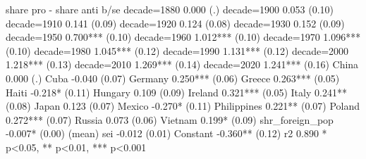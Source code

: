 	share pro - share anti
	b/se
decade=1880	0.000
	(.)
decade=1900	0.053
	(0.10)
decade=1910	0.141
	(0.09)
decade=1920	0.124
	(0.08)
decade=1930	0.152
	(0.09)
decade=1950	0.700***
	(0.10)
decade=1960	1.012***
	(0.10)
decade=1970	1.096***
	(0.10)
decade=1980	1.045***
	(0.12)
decade=1990	1.131***
	(0.12)
decade=2000	1.218***
	(0.13)
decade=2010	1.269***
	(0.14)
decade=2020	1.241***
	(0.16)
China	0.000
	(.)
Cuba	-0.040
	(0.07)
Germany	0.250***
	(0.06)
Greece	0.263***
	(0.05)
Haiti	-0.218*
	(0.11)
Hungary	0.109
	(0.09)
Ireland	0.321***
	(0.05)
Italy	0.241**
	(0.08)
Japan	0.123
	(0.07)
Mexico	-0.270*
	(0.11)
Philippines	0.221**
	(0.07)
Poland	0.272***
	(0.07)
Russia	0.073
	(0.06)
Vietnam	0.199*
	(0.09)
shr_foreign_pop	-0.007*
	(0.00)
(mean) sei	-0.012
	(0.01)
Constant	-0.360**
	(0.12)
r2	0.890
* p<0.05, ** p<0.01, *** p<0.001
